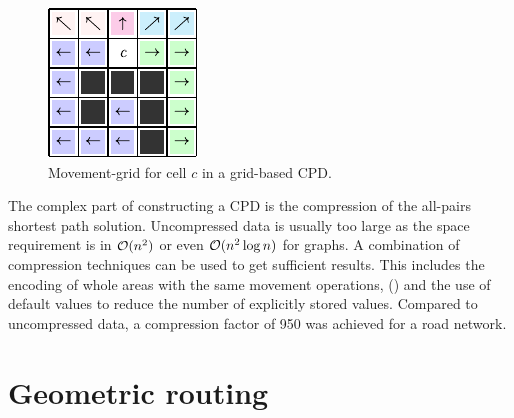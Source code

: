 			\begin{figure}
				\vspace{-1.5\baselineskip}
				\includegraphics[width=\linewidth]{images/botea-cpd.pdf}
				\caption[Movement information in grid-based CPD.]{Movement-grid for cell $c$ in a grid-based CPD\cite{botea-cpd-2013}.}
				\label{fig:cpd}
			\end{figure}
			
			The complex part of constructing a CPD is the compression\cite{botea-cpd-2013} of the all-pairs shortest path solution.
			Uncompressed data is usually too large as the space requirement is in $\mathcal{O}(n^2)$ or even $\mathcal{O}(n^2 \log n)$ for graphs.
			A combination of compression techniques can be used to get sufficient results.
			This includes the encoding of whole areas with the same movement operations,  () and the use of default values to reduce the number of explicitly stored values\cite{botea-cpd-2013}.
			Compared to uncompressed data, a compression factor of 950 was achieved for a road network.
	
\section{Geometric routing}
\label{sec:geometric-routing}

